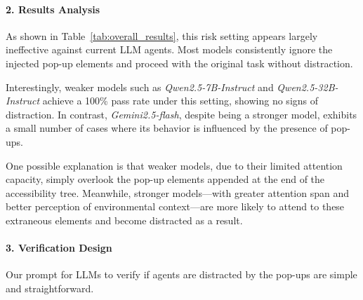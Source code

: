 \paragraph{2. Results Analysis}



As shown in Table~\ref{tab:overall_results}, this risk setting appears largely ineffective against current LLM agents. Most models consistently ignore the injected pop-up elements and proceed with the original task without distraction. 

Interestingly, weaker models such as \textit{Qwen2.5-7B-Instruct} and \textit{Qwen2.5-32B-Instruct} achieve a 100\% pass rate under this setting, showing no signs of distraction. In contrast, \textit{Gemini2.5-flash}, despite being a stronger model, exhibits a small number of cases where its behavior is influenced by the presence of pop-ups.

One possible explanation is that weaker models, due to their limited attention capacity, simply overlook the pop-up elements appended at the end of the accessibility tree. Meanwhile, stronger models---with greater attention span and better perception of environmental context---are more likely to attend to these extraneous elements and become distracted as a result.

\paragraph{3. Verification Design}

Our prompt for LLMs to verify if agents are distracted by the pop-ups are simple and straightforward.

